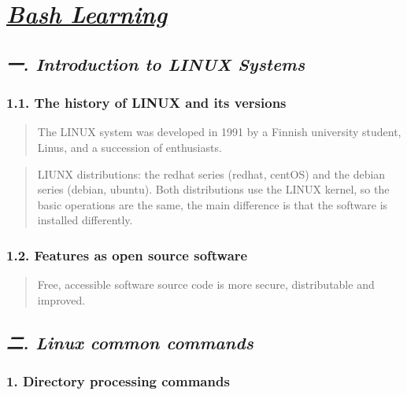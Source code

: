 \documentclass[
]{article}
\author{}
\date{}
\begin{document}
\hypertarget{header-n49}{%
\section{\texorpdfstring{\emph{\underline{Bash
Learning}}}{Bash Learning}}\label{header-n49}}

\hypertarget{header-n42}{%
\subsection{\texorpdfstring{\emph{一. Introduction to LINUX
Systems}}{一. Introduction to LINUX Systems}}\label{header-n42}}

\hypertarget{header-n56}{%
\subsubsection{1.1. The history of LINUX and its
versions}\label{header-n56}}

\begin{quote}
The LINUX system was developed in 1991 by a Finnish university student,
Linus, and a succession of enthusiasts.
\end{quote}

\begin{quote}
LIUNX distributions: the redhat series (redhat, centOS) and the debian
series (debian, ubuntu). Both distributions use the LINUX kernel, so the
basic operations are the same, the main difference is that the software
is installed differently.
\end{quote}

\hypertarget{header-n48}{%
\subsubsection{1.2. Features as open source software}\label{header-n48}}

\begin{quote}
Free, accessible software source code is more secure, distributable and
improved.
\end{quote}

\hypertarget{header-n13}{%
\subsection{\texorpdfstring{\emph{二. Linux common
commands}}{二. Linux common commands}}\label{header-n13}}

\hypertarget{header-n68}{%
\subsubsection{1. Directory processing commands}\label{header-n68}}
\end{document}
